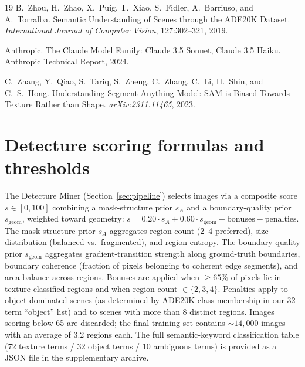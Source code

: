 \documentclass{article}
\begin{document}
\begin{thebibliography}{19}
B.~Zhou, H.~Zhao, X.~Puig, T.~Xiao, S.~Fidler, A.~Barriuso, and A.~Torralba.
\newblock Semantic Understanding of Scenes through the {ADE20K} Dataset.
\newblock \emph{International Journal of Computer Vision}, 127:302--321, 2019.

Anthropic.
\newblock The Claude Model Family: Claude 3.5 Sonnet, Claude 3.5 Haiku.
\newblock Anthropic Technical Report, 2024.

C.~Zhang, Y.~Qiao, S.~Tariq, S.~Zheng, C.~Zhang, C.~Li, H.~Shin, and C.~S.~Hong.
\newblock Understanding Segment Anything Model: {SAM} is Biased Towards Texture Rather than Shape.
\newblock \emph{arXiv:2311.11465}, 2023.

\end{thebibliography}


\appendix

\section{Detecture scoring formulas and thresholds}
\label{app:scoring}
The Detecture Miner (Section~\ref{sec:pipeline}) selects images via a composite score $s \in [0, 100]$ combining a mask-structure prior $s_A$ and a boundary-quality prior $s_{\text{geom}}$, weighted toward geometry: $s = 0.20 \cdot s_A + 0.60 \cdot s_{\text{geom}} + \text{bonuses} - \text{penalties}$. The mask-structure prior $s_A$ aggregates region count (2--4 preferred), size distribution (balanced vs.\ fragmented), and region entropy. The boundary-quality prior $s_{\text{geom}}$ aggregates gradient-transition strength along ground-truth boundaries, boundary coherence (fraction of pixels belonging to coherent edge segments), and area balance across regions. Bonuses are applied when ${\geq}65\%$ of pixels lie in texture-classified regions and when region count $\in \{2, 3, 4\}$. Penalties apply to object-dominated scenes (as determined by ADE20K class membership in our 32-term ``object'' list) and to scenes with more than 8 distinct regions. Images scoring below 65 are discarded; the final training set contains ${\sim}14{,}000$ images with an average of 3.2 regions each. The full semantic-keyword classification table (72 texture terms / 32 object terms / 10 ambiguous terms) is provided as a JSON file in the supplementary archive.
\end{document}
